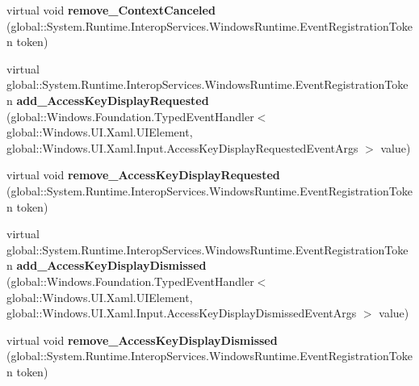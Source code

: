 \begin{DoxyCompactItemize}
\item 
\mbox{\label{class_windows_1_1_u_i_1_1_xaml_1_1_u_i_element_a62c78b7595f4771d8fae8188641db45e}} 
virtual void {\bfseries remove\+\_\+\+Context\+Canceled} (global\+::\+System.\+Runtime.\+Interop\+Services.\+Windows\+Runtime.\+Event\+Registration\+Token token)
\item 
\mbox{\label{class_windows_1_1_u_i_1_1_xaml_1_1_u_i_element_a33aadbdcdc9a08239adba0ea7ca3dc2c}} 
virtual global\+::\+System.\+Runtime.\+Interop\+Services.\+Windows\+Runtime.\+Event\+Registration\+Token {\bfseries add\+\_\+\+Access\+Key\+Display\+Requested} (global\+::\+Windows.\+Foundation.\+Typed\+Event\+Handler$<$ global\+::\+Windows.\+U\+I.\+Xaml.\+U\+I\+Element, global\+::\+Windows.\+U\+I.\+Xaml.\+Input.\+Access\+Key\+Display\+Requested\+Event\+Args $>$ value)
\item 
\mbox{\label{class_windows_1_1_u_i_1_1_xaml_1_1_u_i_element_aa685659f05df9a84a04f9b4fba77ddf8}} 
virtual void {\bfseries remove\+\_\+\+Access\+Key\+Display\+Requested} (global\+::\+System.\+Runtime.\+Interop\+Services.\+Windows\+Runtime.\+Event\+Registration\+Token token)
\item 
\mbox{\label{class_windows_1_1_u_i_1_1_xaml_1_1_u_i_element_a15fc48463bdeec03ee1aee7533f254f0}} 
virtual global\+::\+System.\+Runtime.\+Interop\+Services.\+Windows\+Runtime.\+Event\+Registration\+Token {\bfseries add\+\_\+\+Access\+Key\+Display\+Dismissed} (global\+::\+Windows.\+Foundation.\+Typed\+Event\+Handler$<$ global\+::\+Windows.\+U\+I.\+Xaml.\+U\+I\+Element, global\+::\+Windows.\+U\+I.\+Xaml.\+Input.\+Access\+Key\+Display\+Dismissed\+Event\+Args $>$ value)
\item 
\mbox{\label{class_windows_1_1_u_i_1_1_xaml_1_1_u_i_element_a7a81e564e7ffcf9a6e1afd9c0e1dacc7}} 
virtual void {\bfseries remove\+\_\+\+Access\+Key\+Display\+Dismissed} (global\+::\+System.\+Runtime.\+Interop\+Services.\+Windows\+Runtime.\+Event\+Registration\+Token token)
\item 
\mbox{\label{class_windows_1_1_u_i_1_1_xaml_1_1_u_i_element_a15ef4390a0a3d7f9f3319b6729fd010b}} 

\end{DoxyCompactItemize}
